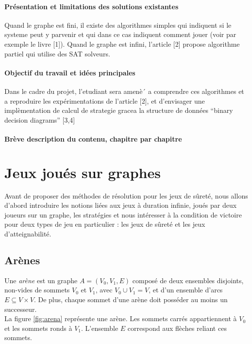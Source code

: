 \documentclass[12pt,a4paper,oneside,titlepage]{report}
\begin{document}
\subsubsection*{Présentation et limitations des solutions existantes}
Quand le
graphe est fini, il existe des algorithmes simples qui indiquent si le systeme peut y parvenir et qui dans ce cas
indiquent comment jouer (voir par exemple le livre [1]). Quand le graphe est infini, l’article [2] propose 
algorithme partiel qui utilise des SAT solveurs.
\subsubsection*{Objectif du travail et idées principales}
Dans le cadre du projet, l’etudiant sera amenè´ a comprendre
ces algorithmes et a reproduire les expérimentations de l’article [2], et d’envisager une implèmentation de
calcul de strategie gracea la structure de données “binary decision diagrams” [3,4]
\subsubsection*{Brève description du contenu, chapitre par chapitre}
\newpage

\chapter{Jeux joués sur graphes}\label{ch:1}
\renewcommand{\leftmark}{CHAPITRE \thechapter.~~Jeux joués sur graphes}
Avant de proposer des méthodes de résolution pour les jeux de sûreté, nous allons d'abord introduire les notions liées aux jeux à duration infinie, joués par deux joueurs sur un graphe, les stratégies et nous intéresser à la condition de victoire pour deux types de jeu en particulier : les jeux de sûreté et les jeux d'atteignabilité. 
\section{Arènes}
Une \emph{arène} est un graphe $A = (V_0,V_1,E)$ composé de deux ensembles disjoints, non-vides de sommets $V_0$ et $V_1$, avec $V_0 \cup V_1 = V$, et d'un ensemble d'arcs $E \subseteq V\times V$. De plus, chaque sommet d'une arène doit posséder au moins un successeur.\\

\noindent La figure \ref{fig:arena} représente une arène. Les sommets carrés appartiennent à $V_0$ et les sommets ronds à $V_1$. L'ensemble $E$ correspond aux flèches reliant ces sommets.
\end{document}

